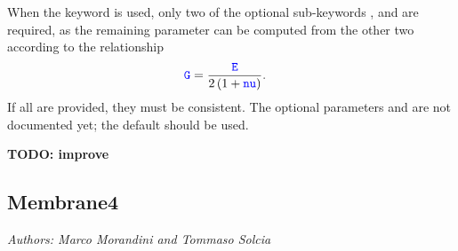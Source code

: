 When the  keyword is used, only two of the optional
sub-keywords ,  and  are required, as the remaining
parameter can be computed from the other two according to the relationship
\begin{align}
	\textcolor{blue}{\texttt{G}}
	&=
	\frac{\textcolor{blue}{\texttt{E}}}{2\left( 1 + \textcolor{blue}{\texttt{nu}} \right)}
	.
\end{align}
If all are provided, they must be consistent.
The optional parameters  and  are not documented yet;
the default should be used.


\textbf{TODO: improve}



\subsection{Membrane4}
\label{sec:EL:PLATE:MEMBRANE4}

\emph{Authors: Marco Morandini and Tommaso Solcia}

